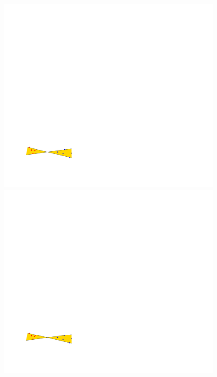 \documentclass[12pt]{article}%
\begin{document}
\begin{figure}[h]
    \phantom{} \hfill%
    \includegraphics[page=1]{figs/bad_example} \hfill%
    \includegraphics[page=2]{figs/bad_example} \hfill%

\end{figure}
\end{document}
